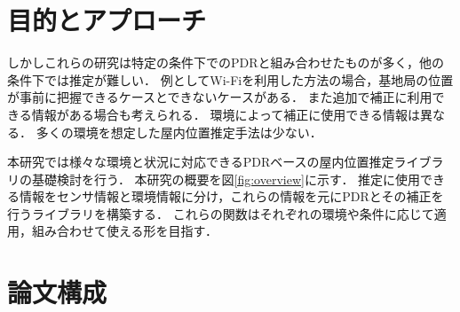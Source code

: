 \section{目的とアプローチ}

しかしこれらの研究は特定の条件下でのPDRと組み合わせたものが多く，他の条件下では推定が難しい．
例としてWi-Fiを利用した方法の場合，基地局の位置が事前に把握できるケースとできないケースがある．
また追加で補正に利用できる情報がある場合も考えられる．
環境によって補正に使用できる情報は異なる．
多くの環境を想定した屋内位置推定手法は少ない．

本研究では様々な環境と状況に対応できるPDRベースの屋内位置推定ライブラリの基礎検討を行う．
本研究の概要を図\ref{fig:overview}に示す．
推定に使用できる情報をセンサ情報と環境情報に分け，これらの情報を元にPDRとその補正を行うライブラリを構築する．
これらの関数はそれぞれの環境や条件に応じて適用，組み合わせて使える形を目指す．




\section{論文構成}
